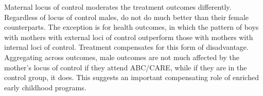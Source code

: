 Maternal locus of control moderates the treatment outcomes differently. Regardless of locus of control males, do not do much better than their female counterparts. The exception is for health outcomes, in which the pattern of boys with mothers with external loci of control outperform those with mothers with internal loci of control. Treatment compensates for this form of disadvantage. Aggregating across outcomes, male outcomes are not much affected by the mother's locus of control if they attend ABC/CARE, while if they are in the control group, it does. This suggests an important compensating role of enriched early childhood programs.



